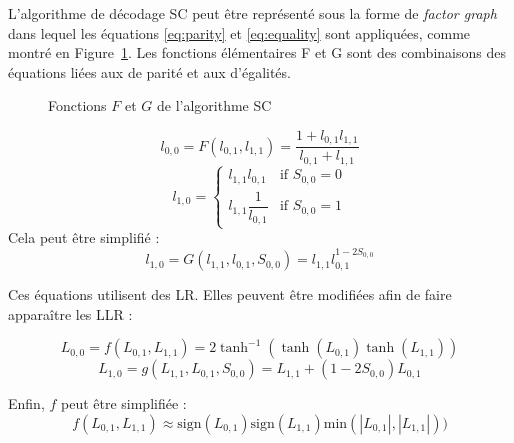 L'algorithme de décodage SC peut être représenté sous la forme de \textit{factor graph} dans lequel les équations \ref{eq:parity} et \ref{eq:equality} sont appliquées, comme montré en Figure~\ref{fig:SCSchedule}. Les fonctions élémentaires F et G sont des combinaisons des équations liées aux \noeuds de parité et aux \noeuds d'égalités.
\begin{figure}[t]
  \centering
  \quad\quad\quad\quad
  \caption{Fonctions $F$ et $G$ de l'algorithme SC}
  \label{fig:SCSchedule}
\end{figure}
\begin{equation}
l_{0,0} = F(l_{0,1}, l_{1,1}) = \dfrac{1+l_{0,1}l_{1,1}}{l_{0,1}+l_{1,1}}
\end{equation}
\[
	l_{1,0} = 
	\begin{cases} 
	l_{1,1}l_{0,1} & \text{if }S_{0,0} = 0\\
	l_{1,1}\dfrac{1}{l_{0,1}} & \text{if }S_{0,0} = 1
	\end{cases}
\]
Cela peut être simplifié : 
\begin{equation}
l_{1,0} = G(l_{1,1},l_{0,1},S_{0,0}) = l_{1,1}l_{0,1}^{1 - 2S_{0,0}}
\end{equation}

Ces équations utilisent des LR. Elles peuvent être modifiées afin de faire apparaître les LLR : 

\begin{equation}
L_{0,0} = f(L_{0,1}, L_{1,1}) = 2\tanh^{-1}(\tanh(L_{0,1})\tanh(L_{1,1}))
\end{equation}
\begin{equation}
L_{1,0} = g(L_{1,1},L_{0,1},S_{0,0}) = L_{1,1} + (1 - 2S_{0,0})L_{0,1}
\end{equation}

Enfin, $f$ peut être simplifiée \cite{fossorier1999reduced} : 
\begin{equation}
f(L_{0,1}, L_{1,1}) \approx \text{sign}(L_{0,1})\text{sign}(L_{1,1})\text{min}(|L_{0,1}|,|L_{1,1}|))
\end{equation}